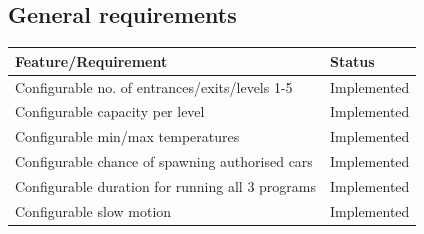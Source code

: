 \documentclass[a4paper]{article}
\begin{document}
\subsection{General requirements}
\begin{tabular}{|m{24.7em}|l|}
  \hline
  \cellcolor{gray!10} \textbf{Feature\slash Requirement} & \cellcolor{gray!10} \textbf{Status}\\
  \hline
  Configurable no. of entrances/exits/levels 1-5 & \cellcolor{green!40}Implemented\\
  \hline
  Configurable capacity per level & \cellcolor{green!40}Implemented\\
  \hline
  Configurable min/max temperatures & \cellcolor{green!40}Implemented\\
  \hline
  Configurable chance of spawning authorised cars & \cellcolor{green!40}Implemented\\
  \hline
  Configurable duration for running all 3 programs & \cellcolor{green!40}Implemented\\
  \hline
  Configurable slow motion & \cellcolor{green!40}Implemented\\
  \hline
\end{tabular}
\end{document}
